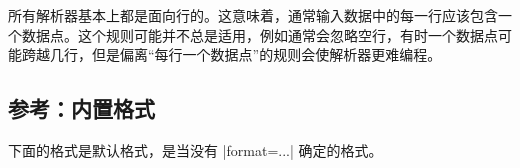 
所有解析器基本上都是面向行的。这意味着，通常输入数据中的每一行应该包含一个数据点。这个规则可能并不总是适用，例如通常会忽略空行，有时一个数据点可能跨越几行，但是偏离``每行一个数据点''的规则会使解析器更难编程。


\subsection{参考：内置格式}


下面的格式是默认格式，是当没有 |format=...| 确定的格式。

